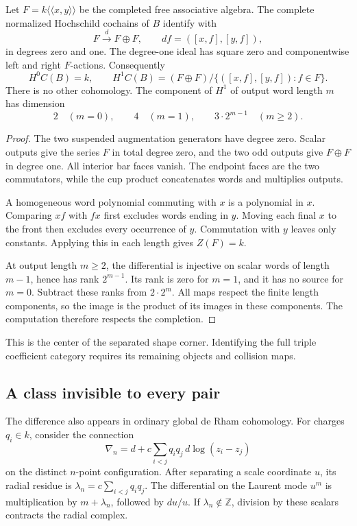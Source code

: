 \begin{proposition}\label{v4-arith:centers:prop:shape}
Let $F=k\langle\!\langle x,y\rangle\!\rangle$
be the completed free associative algebra.
The complete normalized Hochschild cochains of
$B$ identify with
\[
 F\xrightarrow{d}F\oplus F,\qquad
 df=([x,f],[y,f]),
\]
in degrees zero and one. The degree-one ideal
has square zero and componentwise left and
right $F$-actions. Consequently
\[
 H^0C(B)=k,\qquad
 H^1C(B)=
 (F\oplus F)/\{([x,f],[y,f]):f\in F\}.
\]
There is no other cohomology. The component
of $H^1$ of output word length $m$ has
dimension
\[
 2\quad(m=0),\qquad4\quad(m=1),\qquad
 3\cdot2^{m-1}\quad(m\geq2).
\]
\end{proposition}

\begin{proof}
The two suspended augmentation generators have
degree zero. Scalar outputs give the series
$F$ in total degree zero, and the two odd
outputs give $F\oplus F$ in degree one.
All interior bar faces vanish. The endpoint
faces are the two commutators, while the cup
product concatenates words and multiplies
outputs.

A homogeneous word polynomial commuting with
$x$ is a polynomial in $x$. Comparing $xf$ with $fx$ first excludes words ending in $y$.
Moving each final $x$ to the front then excludes every occurrence
of $y$. Commutation with $y$ leaves only
constants. Applying this in each length
gives $Z(F)=k$.

At output length $m\geq2$, the differential
is injective on scalar words of length
$m-1$, hence has rank $2^{m-1}$.
Its rank is zero for $m=1$, and it has no
source for $m=0$. Subtract these ranks from
$2\cdot2^m$. All maps respect the finite
length components, so the image is the
product of its images in these components.
The computation therefore respects the
completion.
\end{proof}

This is the center of the separated shape
corner. Identifying the full triple coefficient
category requires its remaining objects and
collision maps.

\subsection{A class invisible to every pair}
\label{v4-arith:centers:subsec:resonance}

The difference also appears in ordinary global
de Rham cohomology. For charges $q_i\in k$,
consider the connection
\[
 \nabla_n=d+c\sum_{i<j}q_iq_j\,d\log(z_i-z_j)
\]
on the distinct $n$-point configuration.
After separating a scale coordinate $u$, its
radial residue is
$\lambda_n=c\sum_{i<j}q_iq_j$.
The differential on the Laurent mode $u^m$
is multiplication by $m+\lambda_n$, followed
by $du/u$. If $\lambda_n\notin\mathbb Z$,
division by these scalars contracts the
radial complex.

